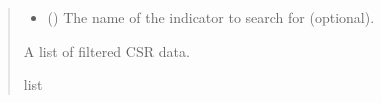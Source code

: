 \documentclass[letterpaper,10pt,english]{sphinxmanual}
\begin{document}
\begin{fulllineitems}
\begin{quote}
\begin{description}
\begin{itemize}
\item {} 
\sphinxAtStartPar
{} (\sphinxstyleliteralemphasis{\sphinxupquote{{[}}}\sphinxstyleliteralemphasis{\sphinxupquote{{]}}}) \textendash{} The name of the indicator to search for (optional).

\end{itemize}

\sphinxAtStartPar
A list of filtered CSR data.

\sphinxAtStartPar
list

\end{description}\end{quote}

\end{fulllineitems}

\end{document}
